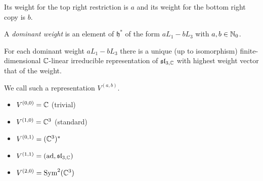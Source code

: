 Its weight for the top right restriction is $a$ and its weight for the bottom right copy is $b$. 

\begin{definition}
    A \emph{dominant weight} is an element of $\mathfrak h^*$ of the form $aL_1 - bL_3$ with $a, b \in \mathbb N_0$. 
\end{definition}

\begin{theorem}
    For each dominant weight $aL_1 - bL_3$ there is a unique (up to isomorphism) finite-dimensional $\mathbb C$-linear irreducible representation of $\mathfrak{sl}_{3, \mathbb C}$ with highest weight vector that of the weight. 
\end{theorem}

We call such a representation $V^{(a,b)}$. 

\begin{example}\hspace{0em}
    \begin{itemize}
        \item $V^{(0,0)} = \mathbb C$ (trivial)
        \item $V^{(1,0)} = \mathbb C^3$ (standard)
        \item $V^{(0,1)} = (\mathbb C^3)^*$
        \item $V^{(1,1)} = (\operatorname{ad}, \mathfrak{sl}_{3, \mathbb C})$
        \item $V^{(2,0)} = \operatorname{Sym}^2(\mathbb C^3)$
    \end{itemize}    
\end{example}

